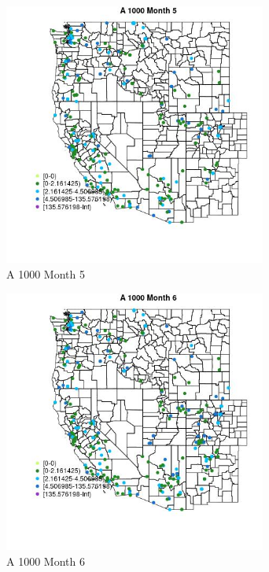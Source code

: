 \begin{figure} 
\centering  
\includegraphics[width=0.77\textwidth]{Code_Outputs/Report_ML_input_PM25_Step4_part_e_de_duplicated_aveswNAs_MapObsMo5A_1000.jpg} 
\caption{\label{fig:Report_ML_input_PM25_Step4_part_e_de_duplicated_aveswNAsMapObsMo5A_1000}A 1000 Month 5} 
\end{figure} 
 

\begin{figure} 
\centering  
\includegraphics[width=0.77\textwidth]{Code_Outputs/Report_ML_input_PM25_Step4_part_e_de_duplicated_aveswNAs_MapObsMo6A_1000.jpg} 
\caption{\label{fig:Report_ML_input_PM25_Step4_part_e_de_duplicated_aveswNAsMapObsMo6A_1000}A 1000 Month 6} 
\end{figure} 
 

